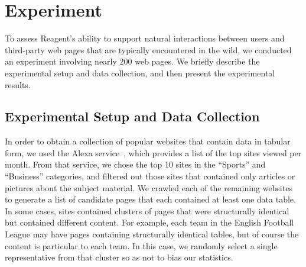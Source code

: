 \section{Experiment}

To assess Reagent's ability to support natural interactions between users and third-party web pages that are typically encountered in the wild, we conducted an experiment involving nearly 200 web pages. We briefly describe the experimental setup and data collection, and then present the experimental results.

\subsection{Experimental Setup and Data Collection}
In order to obtain a collection of popular websites that contain data in tabular form, we used the Alexa service~\cite{noauthor_top_nodate}, which provides a list of the top sites viewed per month. From that service, we chose the top 10 sites in the ``Sports'' and ``Business'' categories, and filtered out those sites that contained only articles or pictures about the subject material. We crawled each of the remaining websites to generate a list of candidate pages that each contained at least one data table. In some cases, sites contained clusters of pages that were structurally identical but contained different content. For example, each team in the English Football League may have pages containing structurally identical tables, but of course the content is particular to each team. In this case, we randomly select a single representative from that cluster so as not to bias our statistics.

